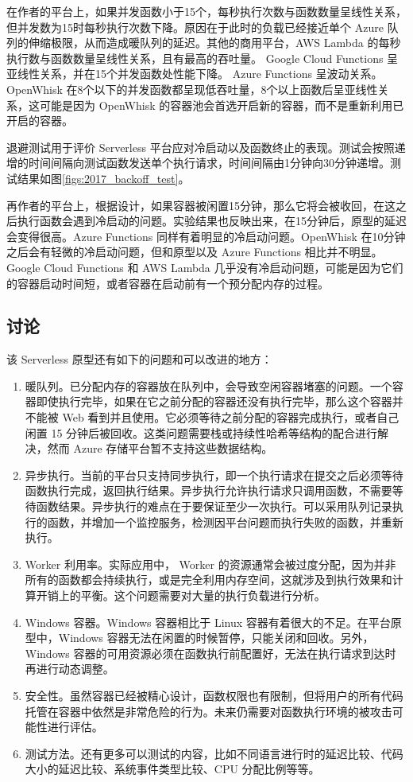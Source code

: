 \documentclass[11pt]{article}
\begin{document}
在作者的平台上，如果并发函数小于15个，每秒执行次数与函数数量呈线性关系，但并发数为15时每秒执行次数下降。原因在于此时的负载已经接近单个 Azure 队列的伸缩极限，从而造成暖队列的延迟。其他的商用平台，AWS Lambda 的每秒执行数与函数数量呈线性关系，且有最高的吞吐量。 Google Cloud Functions 呈亚线性关系，并在15个并发函数处性能下降。 Azure Functions 呈波动关系。 OpenWhisk 在8个以下的并发函数都呈现低吞吐量，8个以上函数后呈亚线性关系，这可能是因为 OpenWhisk 的容器池会首选开启新的容器，而不是重新利用已开启的容器。

退避测试用于评价 Serverless 平台应对冷启动以及函数终止的表现。测试会按照递增的时间间隔向测试函数发送单个执行请求，时间间隔由1分钟向30分钟递增。测试结果如图\ref{figs:2017_backoff_test}。


再作者的平台上，根据设计，如果容器被闲置15分钟，那么它将会被收回，在这之后执行函数会遇到冷启动的问题。实验结果也反映出来，在15分钟后，原型的延迟会变得很高。Azure Functions 同样有着明显的冷启动问题。OpenWhisk 在10分钟之后会有轻微的冷启动问题，但和原型以及 Azure Functions 相比并不明显。Google Cloud Functions 和 AWS Lambda 几乎没有冷启动问题，可能是因为它们的容器启动时间短，或者容器在启动前有一个预分配内存的过程。

\subsection{讨论}
该 Serverless 原型还有如下的问题和可以改进的地方：
\begin{enumerate}
	\item 暖队列。已分配内存的容器放在队列中，会导致空闲容器堵塞的问题。一个容器即使执行完毕，如果在它之前分配的容器还没有执行完毕，那么这个容器并不能被 Web 看到并且使用。它必须等待之前分配的容器完成执行，或者自己闲置 15 分钟后被回收。这类问题需要栈或持续性哈希等结构的配合进行解决，然而 Azure 存储平台暂不支持这些数据结构。
	\item 异步执行。当前的平台只支持同步执行，即一个执行请求在提交之后必须等待函数执行完成，返回执行结果。异步执行允许执行请求只调用函数，不需要等待函数结果。异步执行的难点在于要保证至少一次执行。可以采用队列记录执行的函数，并增加一个监控服务，检测因平台问题而执行失败的函数，并重新执行。
	\item Worker 利用率。实际应用中， Worker 的资源通常会被过度分配，因为并非所有的函数都会持续执行，或是完全利用内存空间，这就涉及到执行效果和计算开销上的平衡。这个问题需要对大量的执行负载进行分析。
	\item Windows 容器。Windows 容器相比于 Linux 容器有着很大的不足。在平台原型中，Windows 容器无法在闲置的时候暂停，只能关闭和回收。另外，Windows 容器的可用资源必须在函数执行前配置好，无法在执行请求到达时再进行动态调整。
	\item 安全性。虽然容器已经被精心设计，函数权限也有限制，但将用户的所有代码托管在容器中依然是非常危险的行为。未来仍需要对函数执行环境的被攻击可能性进行评估。
	\item 测试方法。还有更多可以测试的内容，比如不同语言进行时的延迟比较、代码大小的延迟比较、系统事件类型比较、CPU 分配比例等等。
\end{enumerate}
\end{document}
